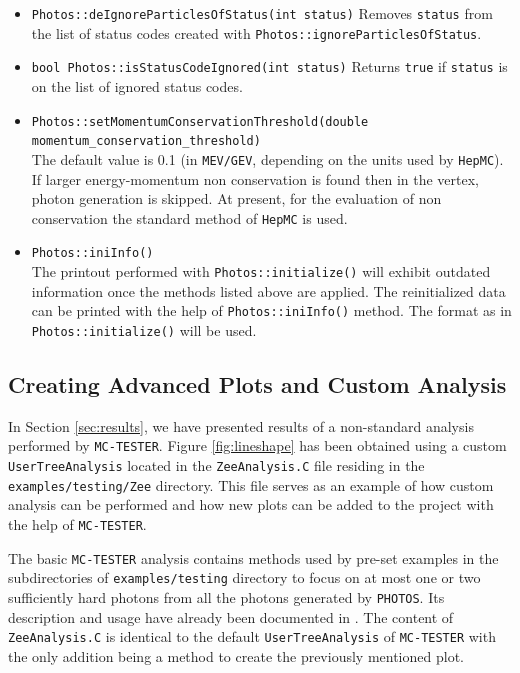 \documentclass[]{Photos_interface_design}
\begin{document}
\begin{itemize}
        {\tt status} will be ignored in check of momentum conservation and will not be passed
        to algorithm generating bremsstrahlung.
  \item {\tt Photos::deIgnoreParticlesOfStatus(int status)} Removes {\tt status} from
        the list of status codes created with {\tt Photos::ignoreParticlesOfStatus}.
  \item {\tt bool Photos::isStatusCodeIgnored(int status)} Returns {\tt true} if {\tt status}
        is on the list of ignored status codes.
  \item {\tt Photos::setMomentumConservationThreshold(double momentum\_{}conservation\_{}threshold)} \\
        The default value is 0.1 (in {\tt MEV/GEV}, depending
on the units used by {\tt HepMC}). If larger energy-momentum non conservation
        is found then in  the vertex, photon generation  is skipped. 
        At present, for the evaluation of non conservation  the standard method of {\tt HepMC}
        is used.
  \item {\tt Photos::iniInfo()} \\
        The printout performed with  {\tt Photos::initialize()}  will exhibit 
        outdated information
        once the methods listed above are applied. The reinitialized data can be printed with 
        the help of  {\tt Photos::iniInfo()} method.
        The format as in {\tt Photos::initialize()}  will be used.		
\end{itemize}

\subsection{Creating Advanced Plots and Custom Analysis}
\label{App:Plots}

In Section \ref{sec:results}, we have presented results of a non-standard
analysis performed by {\tt MC-TESTER}. Figure \ref{fig:lineshape} has been
obtained using a custom {\tt UserTreeAnalysis} located in the {\tt ZeeAnalysis.C} file
residing in the {\tt examples/testing/Zee} directory. This file serves as an
example of how custom analysis can be performed and how new plots can be
added to the project with the help of {\tt MC-TESTER}.

The basic {\tt MC-TESTER} analysis contains methods used by pre-set examples
in the subdirectories of {\tt examples/testing} directory to focus on at most one or two 
sufficiently hard photons from all the photons generated
by {\tt PHOTOS}. Its description and usage have already been documented in \cite{Davidson:2008ma}.
The content of {\tt ZeeAnalysis.C} is identical to the default {\tt UserTreeAnalysis}
of {\tt MC-TESTER} with the only addition being a method to create
the previously mentioned plot.
\end{document}
